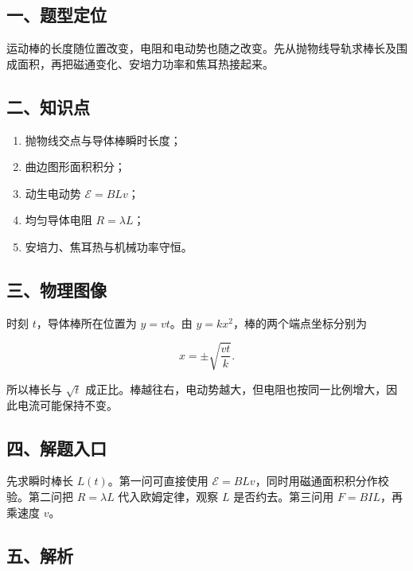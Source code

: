 \documentclass[12pt,a4paper,UTF8]{ctexart}
\newcommand{\tightlist}{\setlength{\itemsep}{0pt}\setlength{\parskip}{0pt}}
\begin{document}
\subsection{一、题型定位}\label{ux4e00ux9898ux578bux5b9aux4f4d-3}

运动棒的长度随位置改变，电阻和电动势也随之改变。先从抛物线导轨求棒长及围成面积，再把磁通变化、安培力功率和焦耳热接起来。

\subsection{二、知识点}\label{ux4e8cux77e5ux8bc6ux70b9-3}

\begin{enumerate}
\def\labelenumi{\arabic{enumi}.}
\tightlist
\item
  抛物线交点与导体棒瞬时长度；
\item
  曲边图形面积积分；
\item
  动生电动势 \(\mathcal E=BLv\)；
\item
  均匀导体电阻 \(R=\lambda L\)；
\item
  安培力、焦耳热与机械功率守恒。
\end{enumerate}

\subsection{三、物理图像}\label{ux4e09ux7269ux7406ux56feux50cf-3}

时刻 \(t\)，导体棒所在位置为 \(y=vt\)。由
\(y=kx^2\)，棒的两个端点坐标分别为

\[
x=\pm\sqrt{\frac{vt}{k}}.
\]

所以棒长与 \(\sqrt t\)
成正比。棒越往右，电动势越大，但电阻也按同一比例增大，因此电流可能保持不变。

\subsection{四、解题入口}\label{ux56dbux89e3ux9898ux5165ux53e3-3}

先求瞬时棒长 \(L(t)\)。第一问可直接使用
\(\mathcal E=BLv\)，同时用磁通面积积分作校验。第二问把 \(R=\lambda L\)
代入欧姆定律，观察 \(L\) 是否约去。第三问用 \(F=BIL\)，再乘速度 \(v\)。

\subsection{五、解析}\label{ux4e94ux89e3ux6790-3}
\end{document}
